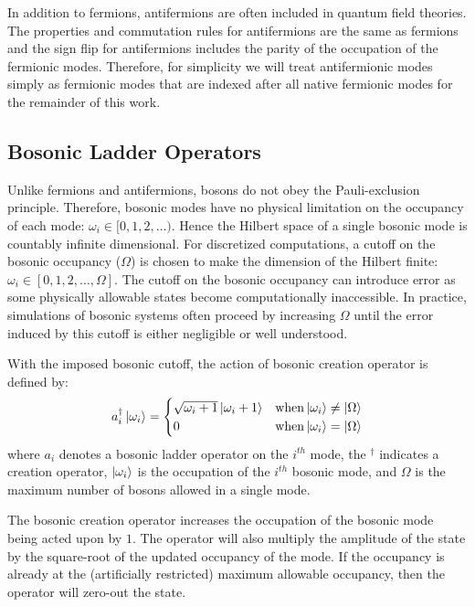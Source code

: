 In addition to fermions, antifermions are often included in quantum field theories.
The properties and commutation rules for antifermions are the same as fermions and the sign flip for antifermions includes the parity of the occupation of the fermionic modes.
Therefore, for simplicity we will treat antifermionic modes simply as fermionic modes that are indexed after all native fermionic modes for the remainder of this work.

\subsection{Bosonic Ladder Operators}
\label{subsec:bosonic-ladder}

Unlike fermions and antifermions, bosons do not obey the Pauli-exclusion principle.
Therefore, bosonic modes have no physical limitation on the occupancy of each mode: $\omega_{i} \in [0, 1, 2, \dots)$.
Hence the Hilbert space of a single bosonic mode is countably infinite dimensional. 
For discretized computations, a cutoff on the bosonic occupancy ($\Omega$) is chosen to make the dimension of the Hilbert finite: $\omega_i \in [0, 1, 2, \dots, \Omega]$.
The cutoff on the bosonic occupancy can introduce error as some physically allowable states become computationally inaccessible.
In practice, simulations of bosonic systems often proceed by increasing $\Omega$ until the error induced by this cutoff is either negligible or well understood.

With the imposed bosonic cutoff, the action of bosonic creation operator is defined by:
\begin{equation}
    \label{eq:bosonic-creation}
    a_i^\dagger \ket{\omega_i} = 
    \begin{cases} 
        \sqrt{\omega_i + 1} \ket{\omega_i + 1}  & {\rm when} \ket{\omega_i} \neq \ket{\Omega} \\
        0 & {\rm when} \ket{\omega_i} = \ket{\Omega}
    \end{cases}
\end{equation}
where $a_i$ denotes a bosonic ladder operator on the $i^{th}$ mode, the $^\dagger$ indicates a creation operator, $\ket{\omega_i}$ is the occupation of the $i^{th}$ bosonic mode, and $\Omega$ is the maximum number of bosons allowed in a single mode.

The bosonic creation operator increases the occupation of the bosonic mode being acted upon by $1$.
The operator will also multiply the amplitude of the state by the square-root of the updated occupancy of the mode.
If the occupancy is already at the (artificially restricted) maximum allowable occupancy, then the operator will zero-out the state.

